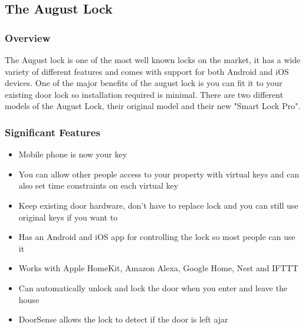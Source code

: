 \subsection{The August Lock}
\subsubsection{Overview}
The August lock is one of the most well known locks on the market, it has a wide variety of different features and comes with support for both Android and iOS devices. One of the major benefits of the august lock is you can fit it to your existing door lock so installation required is minimal. There are two different models of the August Lock, their original model and their new "Smart Lock Pro".

\subsubsection{Significant Features}
\begin{itemize}
	\item Mobile phone is now your key
	\item You can allow other people access to your property with virtual keys and can also set time constraints on each virtual key
	\item Keep existing door hardware, don't have to replace lock and you can still use original keys if you want to
	\item Has an Android and iOS app for controlling the lock so most people can use it
	\item Works with Apple HomeKit, Amazon Alexa, Google Home, Nest and IFTTT
	\item Can automatically unlock and lock the door when you enter and leave the house
	\item DoorSense allows the lock to detect if the door is left ajar
\end{itemize}

